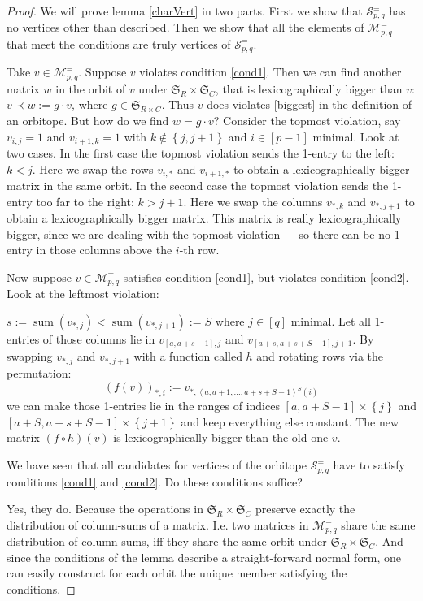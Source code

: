 \documentclass[a4paper]{amsart}
\theoremstyle{lemma}
\theoremstyle{definition}
\theoremstyle{remark}
\theoremstyle{example}
\newcommand{\lr}[1]{\ensuremath{\left( #1 \right)}}
\newcommand{\lrE}[1]{\ensuremath{\left[ #1 \right]}}
\newcommand{\lrM}[1]{\ensuremath{\left\{ #1 \right\}}}
\newcommand{\lrX}[1]{\ensuremath{\left< #1 \right>}}
\newcommand{\M}{\ensuremath{\mathcal{M}}}
\newcommand{\calS}{\ensuremath{\mathcal{S}}}
\newcommand{\Sym}{\ensuremath{\mathfrak{S}}}
\newcommand{\SymRC}{\ensuremath{\Sym_R \times \Sym_C}}
\begin{document}
\begin{proof}
  We will prove lemma \ref{charVert} in two parts.  First we show that
  \(\calS{}^=_{p, q}\) has no vertices other than described.  Then we
  show that all the elements of \(\M^=_{p, q}\) that meet the
  conditions are truly vertices of \(\calS^=_{p, q}\). 

  Take \(v \in \M^=_{p, q}\).  Suppose \(v\) violates condition
  \ref{cond1}.  Then we can find another matrix \(w\) in the orbit of
  \(v\) under \(\SymRC\), that is lexicographically bigger than \(v\):
  \(v \prec w := g \cdot v\), where \(g \in \Sym_{R \times C}\).  Thus
  \(v\) does violates \ref{biggest} in the definition of an
  orbitope.  %
  But how do we find \(w = g \cdot v\)?  Consider the topmost
  violation, say \(v_{i,j} = 1\) and \(v_{i+1,k} = 1\) with \(k \notin
  \lrM{j,j+1}\) and \(i \in \lrE{p-1}\) minimal.  Look at two
  cases. In the first case the topmost violation sends the 1-entry to
  the left: \(k < j\).  Here we swap the rows \(v_{i,*}\) and
  \(v_{i+1,*}\) to obtain a lexicographically bigger matrix in the
  same orbit.  In the second case the topmost violation sends the
  1-entry too far to the right: \(k > j+1\).  Here we swap the columns
  \(v_{*,k}\) and \(v_{*,j+1}\) to obtain a lexicographically bigger
  matrix.  This matrix is really lexicographically bigger, since we
  are dealing with the topmost violation --- so there can be no
  1-entry in those columns above the \(i\)-th row.

  Now suppose \(v \in \M^=_{p, q}\) satisfies condition \ref{cond1}, but violates
  condition \ref{cond2}.  Look at the leftmost violation:



  \(s := \mathop{sum} \lr{v_{*,j}} < \mathop{sum} \lr{v_{*,j+1}} := S\) where \(j \in
  \lrE{q}\) minimal.  Let all 1-entries of those columns lie in
  \(v_{\lrE{a,a+s-1},j}\) and \(v_{\lrE{a+s,a+s+S-1},j+1}\).  By
  swapping \(v_{*,j}\) and \(v_{*,j+1}\) with a function called \(h\) and rotating rows via the permutation:
    \[\lr{f \lr{v}}_{*,i} :=  v_{*,\lrX{a, a+1, \dots, a+s+S-1}^S \lr{i}}
  \]
  we can make those 1-entries lie in the ranges of indices
  \({\lrE{a,a+S-1} \times \lrM{j}}\) and \({\lrE{a+S,a+s+S-1} \times
    \lrM{j+1}}\) and keep everything else constant.  The new matrix
  \(\lr{f \circ h} \lr{v}\) is lexicographically bigger than the old
  one \(v\).

  We have seen that all candidates for vertices of the orbitope
  \(\calS^=_{p, q}\) have to satisfy conditions \ref{cond1} and
  \ref{cond2}.  Do these conditions suffice?

  Yes, they do.  Because the operations in \(\SymRC\) preserve exactly
  the distribution of column-sums of a matrix.  I.e. two matrices in
  \(\M^=_{p, q}\) share the same distribution of column-sums, iff they
  share the same orbit under \(\SymRC\).  And since the conditions of
  the lemma describe a straight-forward normal form, one can easily
  construct for each orbit the unique member satisfying the conditions.
\end{proof}
\end{document}
